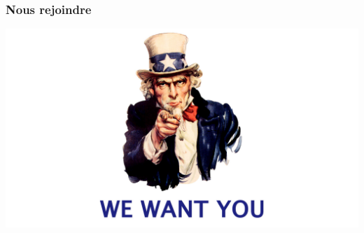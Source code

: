 \documentclass[14pt]{beamer}
\begin{document}

\begin{frame}
    \frametitle{Nous rejoindre}
    \includegraphics[width=\textwidth]{joinus.jpg}
\end{frame}
\end{document}
